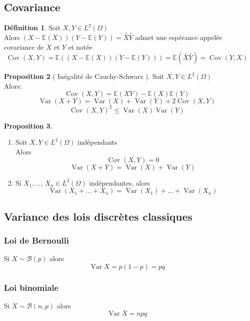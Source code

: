 \documentclass[10pt,a4paper]{article}
\theoremstyle{definition}
\newtheorem{proposition}{Proposition}[section]
\newtheorem{definition}[proposition]{Définition}
\DeclareMathOperator{\var}{Var}
\DeclareMathOperator{\cov}{Cov}
\begin{document}
\subsection{Covariance}
\begin{definition}
    Soit \(X, Y \in L^2(\Omega)\) \\
    Alors \((X - \mathbb{E}(X))(Y - \mathbb{E}(Y)) = \overset{\circ}{X} \overset{\circ}{Y}\) admet une espérance appelée covariance de \(X\) et \(Y\) et notée
    \[\cov(X, Y) = \mathbb{E}\left((X - \mathbb{E}(X))(Y - \mathbb{E}(Y))\right) = \mathbb{E}(\overset{\circ}{X} \overset{\circ}{Y}) = \cov(Y, X)\]
\end{definition}
\begin{proposition}[ Inégalité de Cauchy-Schwarz ]
    Soit \(X, Y \in L^2(\Omega)\) \\
    Alors:
    \[\boxed{\cov(X, Y) = \mathbb{E}(XY) - \mathbb{E}(X) \mathbb{E}(Y)}\]
    \[\boxed{\var(X + Y) = \var(X) + \var(Y) + 2\cov(X, Y)}\]
    \[\boxed{\cov(X, Y)^2 \leq \var(X) \var(Y)}\]
\end{proposition}
\begin{proposition}
    \hfill \begin{enumerate}
        \item Soit \(X, Y \in L^2(\Omega)\) indépendants \\
        Alors \[\boxed{\cov(X, Y) = 0}\] \[\boxed{\var(X + Y) = \var(X) + \var(Y)}\]
        \item Si \(X_1, ...,\, X_n \in L^2(\Omega)\) indépendantes, alors
        \[\boxed{\var(X_1 + ... + X_n) = \var(X_1) + ... + \var(X_n)}\]
    \end{enumerate}
\end{proposition}

\subsection{Variance des lois discrètes classiques}
\subsubsection{Loi de Bernoulli}
\noindent Si \(X \sim \mathcal{B}(p)\) alors
\[\boxed{\var X = p(1 - p) = pq}\]

\subsubsection{Loi binomiale}
\noindent Si \(X \sim \mathcal{B}(n, p)\) alors
\[\boxed{\var X = npq}\]
\end{document}
